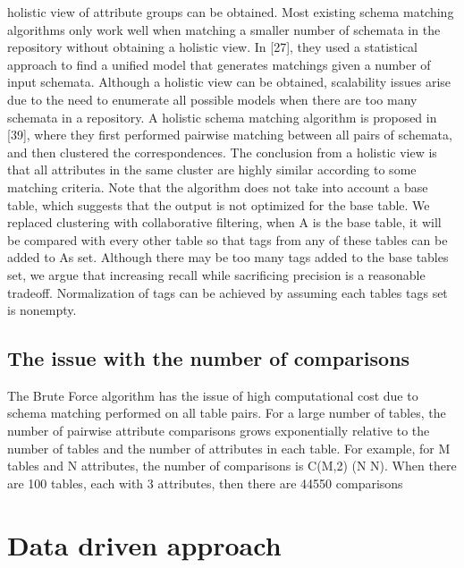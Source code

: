 holistic view of attribute groups can be obtained. Most existing schema matching algorithms only work well when matching a smaller number of schemata in the repository without obtaining a holistic view. In \cite{10.1145/2396761.2398468}[27], they used a statistical approach to find a unified model that generates matchings given a number of input schemata. Although a holistic view can be obtained, scalability issues arise due to the need to enumerate all possible models when there are too many schemata in a repository.
A holistic schema matching algorithm is proposed in \cite{Rahm2016Case}[39], where they first performed pairwise matching between all pairs of schemata, and then clustered the correspondences. The conclusion from a holistic view is that all attributes in the same cluster are highly similar according to some matching criteria. Note that the algorithm does not take into account a base table, which suggests that the output is not optimized for the base table. We replaced clustering with collaborative filtering, when A is the base table, it will be compared with every other table so that tags from any of these tables can be added to As set. Although there may be too many tags added to the base tables set, we argue that increasing recall while sacrificing precision is a reasonable tradeoff. Normalization of tags can be achieved by assuming each tables tags set is nonempty.

\subsection{The issue with the number of comparisons}

The Brute Force algorithm has the issue of high computational cost due to schema matching performed on all table pairs. For a large number of tables, the number of pairwise attribute comparisons grows exponentially relative to the number of tables and the number of attributes in each table. For example, for M tables and N attributes, the number of comparisons is C(M,2)  (N  N). When there are 100 tables, each with 3 attributes, then there are 44550 comparisons

\section{Data driven approach}
\label{sec:DataDrivenApproach}

